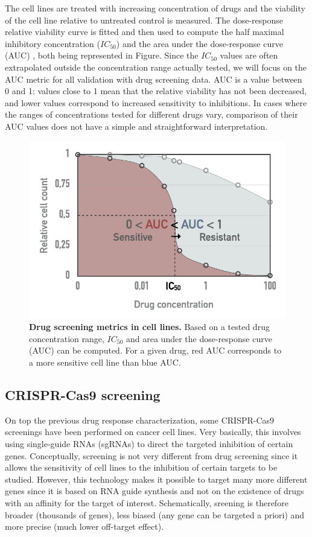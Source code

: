 \documentclass[a4paper,12pt,twoside,onecolumn,openright,final,oldfontcommands]{memoir}
\begin{document}
The cell lines are treated with increasing concentration of drugs and
the viability of the cell line relative to untreated control is
measured. The dose-response relative viability curve is fitted and then
used to compute the half maximal inhibitory concentration (\(IC_{50}\))
and the area under the dose-response curve (AUC)
\citep{vis2016multilevel}, both being represented in Figure. Since the
\(IC_{50}\) values are often extrapolated outside the concentration
range actually tested, we will focus on the AUC metric for all
validation with drug screening data. AUC is a value between 0 and 1:
values close to 1 mean that the relative viability has not been
decreased, and lower values correspond to increased sensitivity to
inhibitions. In cases where the ranges of concentrations tested for
different drugs vary, comparison of their AUC values does not have a
simple and straightforward interpretation.

\begin{figure}

{\centering \includegraphics[width=0.5\linewidth]{fig/AUC} 

}

\caption[Drug screening metrics in cell lines]{\textbf{Drug screening metrics in cell lines.} Based
on a tested drug concentration range, \(IC_{50}\) and area under the
dose-response curve (AUC) can be computed. For a given drug, red AUC
corresponds to a more sensitive cell line than blue AUC.}\label{fig:AUC}
\end{figure}






\subsection{CRISPR-Cas9 screening}\label{appendix-CRISPR}

On top the previous drug response characterization, some CRISPR-Cas9
screenings have been performed on cancer cell lines. Very basically,
this involves using single-guide RNAs (sgRNAs) to direct the targeted
inhibition of certain genes. Conceptually, screening is not very
different from drug screening since it allows the sensitivity of cell
lines to the inhibition of certain targets to be studied. However, this
technology makes it possible to target many more different genes since
it is based on RNA guide synthesis and not on the existence of drugs
with an affinity for the target of interest. Schematically, sreening is
therefore broader (thousands of genes), less biased (any gene can be
targeted a priori) and more precise (much lower off-target effect).
\end{document}
